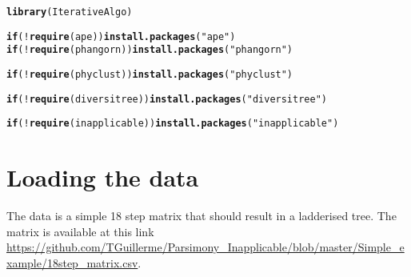 \documentclass{article}\usepackage[]{graphicx}\usepackage[]{color}
\makeatletter
\newcommand{\hlstr}[1]{\textcolor[rgb]{0.192,0.494,0.8}{#1}}%
\newcommand{\hlopt}[1]{\textcolor[rgb]{0,0,0}{#1}}%
\newcommand{\hlstd}[1]{\textcolor[rgb]{0.345,0.345,0.345}{#1}}%
\newcommand{\hlkwa}[1]{\textcolor[rgb]{0.161,0.373,0.58}{\textbf{#1}}}%
\newcommand{\hlkwd}[1]{\textcolor[rgb]{0.737,0.353,0.396}{\textbf{#1}}}%
\newenvironment{kframe}{%
 \def\at@end@of@kframe{}%
 \ifinner\ifhmode%
  \def\at@end@of@kframe{\end{minipage}}%
  \begin{minipage}{\columnwidth}%
 \fi\fi%
 \def\FrameCommand##1{\hskip\@totalleftmargin \hskip-\fboxsep
 \colorbox{shadecolor}{##1}\hskip-\fboxsep
     \hskip-\linewidth \hskip-\@totalleftmargin \hskip\columnwidth}%
 \MakeFramed {\advance\hsize-\width
   \@totalleftmargin\z@ \linewidth\hsize
   \@setminipage}}%
 {\par\unskip\endMakeFramed%
 \at@end@of@kframe}
\newenvironment{knitrout}{}{} %
\makeatother
\begin{document}
\begin{knitrout}
\color{fgcolor}\begin{kframe}
\begin{alltt}
\hlkwd{library}\hlstd{(IterativeAlgo)}
\end{alltt}


{\ttfamily\noindent\color{warningcolor}{\#\# Warning in .doLoadActions(where, attach): trying to execute load actions without 'methods' package}}\begin{alltt}
\hlkwa{if}\hlstd{(}\hlopt{!}\hlkwd{require}\hlstd{(ape))} \hlkwd{install.packages}\hlstd{(}\hlstr{"ape"}\hlstd{)}
\hlkwa{if}\hlstd{(}\hlopt{!}\hlkwd{require}\hlstd{(phangorn))} \hlkwd{install.packages}\hlstd{(}\hlstr{"phangorn"}\hlstd{)}
\end{alltt}


{\ttfamily\noindent\itshape\color{messagecolor}{\#\# Loading required package: phangorn}}\begin{alltt}
\hlkwa{if}\hlstd{(}\hlopt{!}\hlkwd{require}\hlstd{(phyclust))} \hlkwd{install.packages}\hlstd{(}\hlstr{"phyclust"}\hlstd{)}
\end{alltt}


{\ttfamily\noindent\itshape\color{messagecolor}{\#\# Loading required package: phyclust}}\begin{alltt}
\hlkwa{if}\hlstd{(}\hlopt{!}\hlkwd{require}\hlstd{(diversitree))} \hlkwd{install.packages}\hlstd{(}\hlstr{"diversitree"}\hlstd{)}
\end{alltt}


{\ttfamily\noindent\itshape\color{messagecolor}{\#\# Loading required package: diversitree}}\begin{alltt}
\hlkwa{if}\hlstd{(}\hlopt{!}\hlkwd{require}\hlstd{(inapplicable))} \hlkwd{install.packages}\hlstd{(}\hlstr{"inapplicable"}\hlstd{)}
\end{alltt}


{\ttfamily\noindent\itshape\color{messagecolor}{\#\# Loading required package: inapplicable}}

{\ttfamily\noindent\itshape\color{messagecolor}{\#\# Loading required package: parallel}}\end{kframe}
\end{knitrout}

\section{Loading the data}

The data is a simple 18 step matrix that should result in a ladderised tree.
The matrix is available at this link \url{https://github.com/TGuillerme/Parsimony_Inapplicable/blob/master/Simple_example/18step_matrix.csv}.
\end{document}
